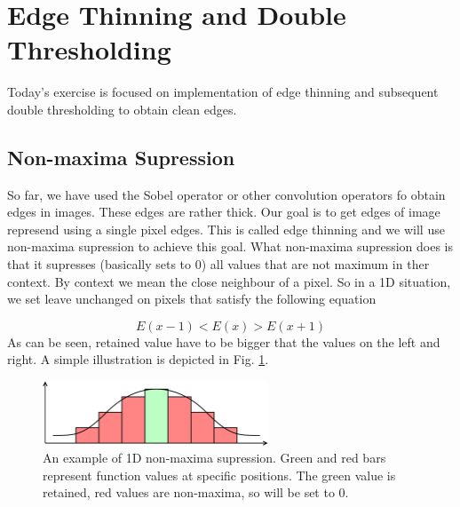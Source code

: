 \documentclass[12pt]{article}
\begin{document}
\section*{Edge Thinning and Double Thresholding}

Today's exercise is focused on implementation of edge thinning and subsequent double thresholding to obtain clean edges.

\subsection*{Non-maxima Supression}

So far, we have used the Sobel operator or other convolution operators fo obtain edges in images.
These edges are rather thick.
Our goal is to get edges of image represend using a single pixel edges.
This is called edge thinning and we will use non-maxima supression to achieve this goal.
What non-maxima supression does is that it supresses (basically sets to 0) all values that are not maximum in ther context.
By context we mean the close neighbour of a pixel.
So in a 1D situation, we set leave unchanged on pixels that satisfy the following equation

\begin{equation} \label{eq:max_1d}
    E(x - 1) < E(x) > E(x + 1)
\end{equation}
As can be seen, retained value have to be bigger that the values on the left and right.
A simple illustration is depicted in Fig. \ref{fig:non-maxima-supression-1d}.

\begin{figure}[h]
\begin{centering}
    \includegraphics[width=0.6\textwidth]{non_maxima_supression_1d}
    \caption{An example of 1D non-maxima supression. Green and red bars represent function values at specific positions. The green value is retained, red values are non-maxima, so will be set to 0.}
    \label{fig:non-maxima-supression-1d}
\end{centering}
\end{figure}
\end{document}
